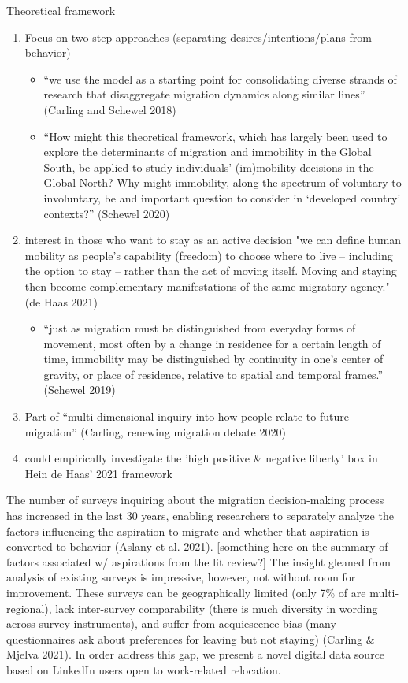 Theoretical framework
\begin{enumerate}
    \item Focus on two-step approaches (separating desires/intentions/plans from behavior)
    \begin{itemize}
        \item “we use the model as a starting point for consolidating diverse strands of research that disaggregate migration dynamics along similar lines” (Carling and Schewel 2018)
        \item “How might this theoretical framework, which has largely been used to explore the determinants of migration and immobility in the Global South, be applied to study individuals’ (im)mobility decisions in the Global North? Why might immobility, along the spectrum of voluntary to involuntary, be and important question to consider in ‘developed country’ contexts?” (Schewel 2020)
    \end{itemize}
    \item interest in those who want to stay as an active decision "we can define human mobility as people’s capability (freedom) to choose where to live – including the option to stay – rather than the act of moving itself. Moving and staying then become complementary manifestations of the same migratory agency." (de Haas 2021)
    \begin{itemize}
        \item “just as migration must be distinguished from everyday forms of movement, most often by a change in residence for a certain length of time, immobility may be distinguished by continuity in one’s center of gravity, or place of residence, relative to spatial and temporal frames.” (Schewel 2019)
    \end{itemize}
    \item Part of “multi-dimensional inquiry into how people relate to future migration” (Carling, renewing migration debate 2020)
    \item could empirically investigate the 'high positive \& negative liberty' box in Hein de Haas' 2021 framework
\end{enumerate}
The number of surveys inquiring about the migration decision-making process has increased in the last 30 years, enabling researchers to separately analyze the factors influencing the aspiration to migrate and whether that aspiration is converted to behavior (Aslany et al. 2021). [something here on the summary of factors associated w/ aspirations from the lit review?] The insight gleaned from analysis of existing surveys is impressive, however, not without room for improvement. These surveys can be geographically limited (only 7\% of are multi-regional), lack inter-survey comparability (there is much diversity in wording across survey instruments), and suffer from acquiescence bias (many questionnaires ask about preferences for leaving but not staying) (Carling & Mjelva 2021). In order address this gap, we present a novel digital data source based on LinkedIn users open to work-related relocation.

